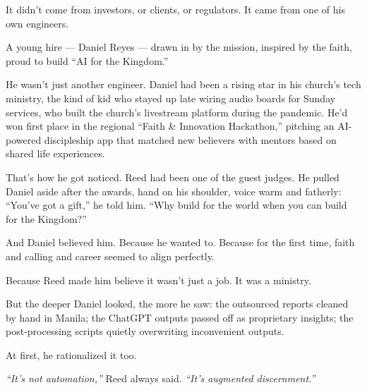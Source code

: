 It didn’t come from investors, or clients, or regulators.  It came from one of his own engineers.

A young hire --- Daniel Reyes --- drawn in by the mission, inspired by the faith, proud to build “AI for the Kingdom.”

He wasn’t just another engineer. Daniel had been a rising star in his church’s tech ministry, the kind of kid who stayed up late wiring audio boards for Sunday services, who built the church’s livestream platform during the pandemic. He’d won first place in the regional “Faith \& Innovation Hackathon,” pitching an AI-powered discipleship app that matched new believers with mentors based on shared life experiences.

That’s how he got noticed. Reed had been one of the guest judges.  
He pulled Daniel aside after the awards, hand on his shoulder, voice warm and fatherly:  
“You’ve got a gift,” he told him.  
“Why build for the world when you can build for the Kingdom?”

And Daniel believed him.  
Because he wanted to.  
Because for the first time, faith and calling and career seemed to align perfectly.

Because Reed made him believe it wasn’t just a job.  It was a ministry.

But the deeper Daniel looked, the more he saw:  
the outsourced reports cleaned by hand in Manila;  
the ChatGPT outputs passed off as proprietary insights;  
the post-processing scripts quietly overwriting inconvenient outputs.  

At first, he rationalized it too.

\textit{“It’s not automation,”} Reed always said.  
\textit{“It’s augmented discernment.”}

\medskip

